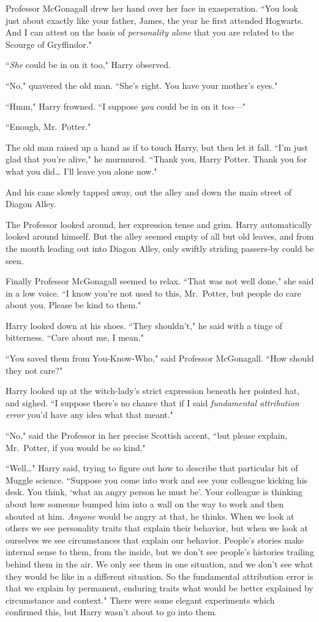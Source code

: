 Professor McGonagall drew her hand over her face in exasperation. ``You look just about exactly like your father, James, the year he first attended Hogwarts. And I can attest on the basis of \emph{personality alone} that you are related to the Scourge of Gryffindor."

``\emph{She} could be in on it too," Harry observed.

``No," quavered the old man. ``She's right. You have your mother's eyes."

``Hmm," Harry frowned. ``I suppose \emph{you} could be in on it too---"

``Enough, Mr.~Potter."

The old man raised up a hand as if to touch Harry, but then let it fall. ``I'm just glad that you're alive," he murmured. ``Thank you, Harry Potter. Thank you for what you did{\ldots} I'll leave you alone now."

And his cane slowly tapped away, out the alley and down the main street of Diagon Alley.

The Professor looked around, her expression tense and grim. Harry automatically looked around himself. But the alley seemed empty of all but old leaves, and from the mouth leading out into Diagon Alley, only swiftly striding passers-by could be seen.

Finally Professor McGonagall seemed to relax. ``That was not well done," she said in a low voice. ``I know you're not used to this, Mr.~Potter, but people do care about you. Please be kind to them."

Harry looked down at his shoes. ``They shouldn't," he said with a tinge of bitterness. ``Care about me, I mean."

``You saved them from You-Know-Who," said Professor McGonagall. ``How should they not care?"

Harry looked up at the witch-lady's strict expression beneath her pointed hat, and sighed. ``I suppose there's no chance that if I said \emph{fundamental attribution error} you'd have any idea what that meant."

``No," said the Professor in her precise Scottish accent, ``but please explain, Mr.~Potter, if you would be so kind."

``Well{\ldots}" Harry said, trying to figure out how to describe that particular bit of Muggle science. ``Suppose you come into work and see your colleague kicking his desk. You think, `what an angry person he must be'. Your colleague is thinking about how someone bumped him into a wall on the way to work and then shouted at him. \emph{Anyone} would be angry at that, he thinks. When we look at others we see personality traits that explain their behavior, but when we look at ourselves we see circumstances that explain our behavior. People's stories make internal sense to them, from the inside, but we don't see people's histories trailing behind them in the air. We only see them in one situation, and we don't see what they would be like in a different situation. So the fundamental attribution error is that we explain by permanent, enduring traits what would be better explained by circumstance and context." There were some elegant experiments which confirmed this, but Harry wasn't about to go into them.

